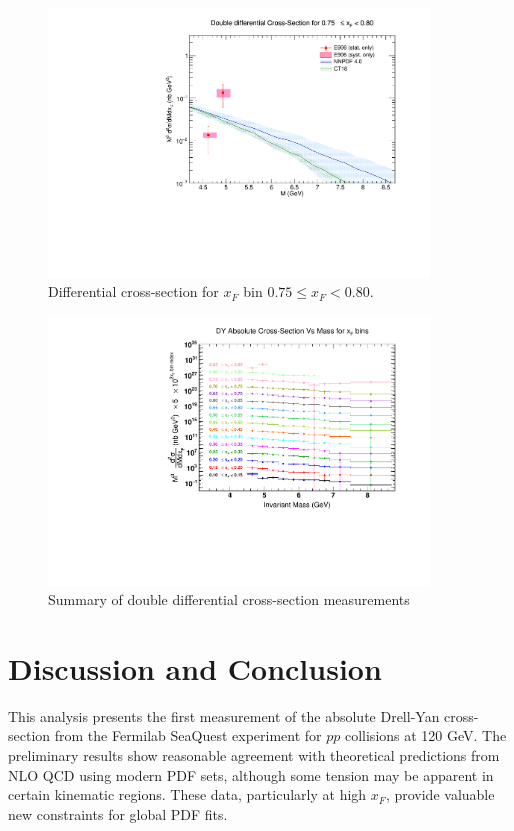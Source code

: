 \documentclass[11pt]{article}
\begin{document}
\clearpage
\begin{figure}[p]
\centering
\includegraphics[width=0.9\textwidth]{./XSecPlots/LH2_15_roofit.pdf}
\caption{Differential cross-section for $x_F$ bin $0.75 \leq x_F < 0.80$.}
\end{figure}
\clearpage
\begin{figure}[p]
\centering
\includegraphics[width=0.9\textwidth]{./XSecPlots/AllXsectionsOnSameCanvas.pdf}
\caption{Summary of double differential cross-section measurements}
\end{figure}
\clearpage

\section{Discussion and Conclusion}
\label{sec:conclusion}
This analysis presents the first measurement of the absolute Drell-Yan cross-section from the Fermilab SeaQuest experiment for $pp$ collisions at 120 GeV. The preliminary results show reasonable agreement with theoretical predictions from NLO QCD using modern PDF sets, although some tension may be apparent in certain kinematic regions. These data, particularly at high $x_F$, provide valuable new constraints for global PDF fits.
\end{document}
